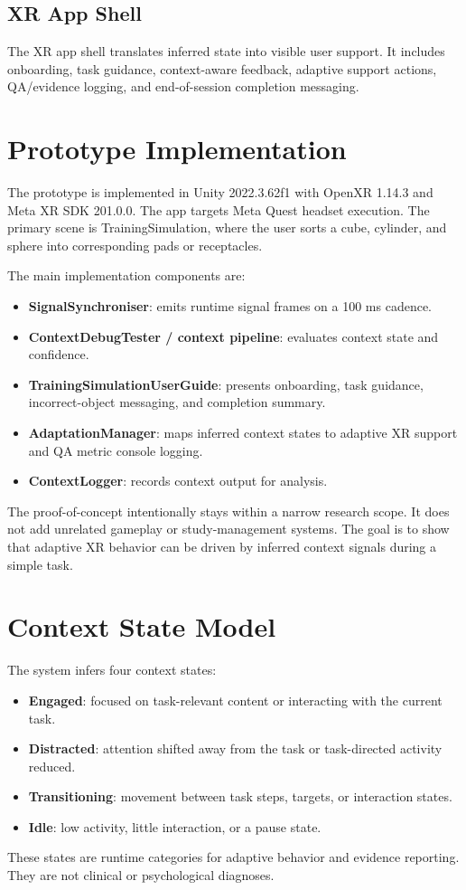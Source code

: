 \documentclass[conference]{IEEEtran}
\begin{document}
\subsection{XR App Shell}
The XR app shell translates inferred state into visible user support. It includes onboarding, task guidance, context-aware feedback, adaptive support actions, QA/evidence logging, and end-of-session completion messaging.

\section{Prototype Implementation}
The prototype is implemented in Unity 2022.3.62f1 with OpenXR 1.14.3 and Meta XR SDK 201.0.0. The app targets Meta Quest headset execution. The primary scene is TrainingSimulation, where the user sorts a cube, cylinder, and sphere into corresponding pads or receptacles.

The main implementation components are:
\begin{itemize}
\item \textbf{SignalSynchroniser}: emits runtime signal frames on a 100 ms cadence.
\item \textbf{ContextDebugTester / context pipeline}: evaluates context state and confidence.
\item \textbf{TrainingSimulationUserGuide}: presents onboarding, task guidance, incorrect-object messaging, and completion summary.
\item \textbf{AdaptationManager}: maps inferred context states to adaptive XR support and QA metric console logging.
\item \textbf{ContextLogger}: records context output for analysis.
\end{itemize}

The proof-of-concept intentionally stays within a narrow research scope. It does not add unrelated gameplay or study-management systems. The goal is to show that adaptive XR behavior can be driven by inferred context signals during a simple task.

\section{Context State Model}
The system infers four context states:
\begin{itemize}
\item \textbf{Engaged}: focused on task-relevant content or interacting with the current task.
\item \textbf{Distracted}: attention shifted away from the task or task-directed activity reduced.
\item \textbf{Transitioning}: movement between task steps, targets, or interaction states.
\item \textbf{Idle}: low activity, little interaction, or a pause state.
\end{itemize}
These states are runtime categories for adaptive behavior and evidence reporting. They are not clinical or psychological diagnoses.
\end{document}

